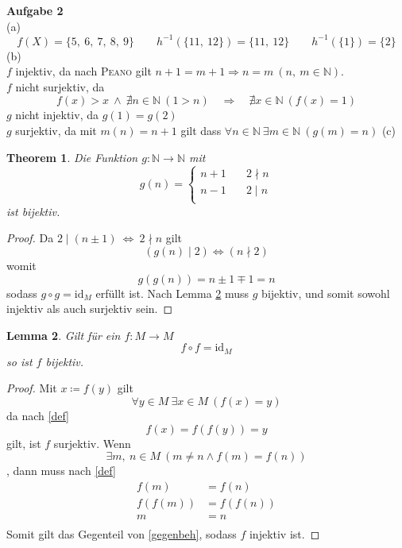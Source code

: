 \documentclass[a4paper, 12pt]{scrartcl}
\theoremstyle{plain}
\newtheorem{theorem}{Theorem}
\newtheorem{lemma}[theorem]{Lemma}
\begin{document}
\textbf{Aufgabe 2}\\
(a)\\
\[ f(X) = \{ 5,\ 6,\ 7,\ 8,\ 9 \} \qquad h^{-1}\left( \{11,\ 12\} \right) = \{11,\ 12\} \qquad h^{-1}(\{1\}) = \{2\} \]
(b)\\
$f$ injektiv, da nach \textsc{Peano} gilt $n+1 = m+1 \Rightarrow n = m\ (n,\ m \in \mathbb{N})$. \\
$f$ nicht surjektiv, da
\[ f(x) > x \ \wedge\ \nexists n \in \mathbb{N}\ (1 > n) \quad \Rightarrow \quad \nexists x \in \mathbb{N}\ (f(x) = 1) \]
$g$ nicht injektiv, da $g(1) = g(2)$ \\
$g$ surjektiv, da mit $m(n) = n+1$ gilt dass $\forall n \in \mathbb{N}\ \exists m \in \mathbb{N}\ (g(m) = n)$
\newpage
(c)
\begin{theorem}
Die Funktion $g : \mathbb{N} \rightarrow \mathbb{N}$ mit
\[ g(n) = \begin{cases} n+1 &\quad 2 \nmid n \\ n-1 &\quad 2 \mid n \\ \end{cases} \]
ist bijektiv.
\end{theorem}
\begin{proof}
Da $2 \mid (n \pm 1) \:\Leftrightarrow\: 2 \nmid n$ gilt
\[ (g(n) \mid 2) \Leftrightarrow (n \nmid 2) \]
womit
\[ g(g(n)) = n \pm 1 \mp 1 = n \]
sodass $g \circ g = \mathrm{id}_M$ erfüllt ist. Nach Lemma \ref{klemma} muss $g$ bijektiv, und somit sowohl injektiv als auch surjektiv sein.
\end{proof}
\begin{lemma}\label{klemma}
Gilt für ein $f:M \rightarrow M$
\begin{equation}\label{def}
	f \circ f = \mathrm{id}_M
\end{equation}
so ist $f$ bijektiv.
\end{lemma}
\begin{proof}
Mit $x \coloneqq f(y)$ gilt
\[ \forall y \in M\ \exists x \in M\ (f(x) = y) \]
da nach \eqref{def}
\[ f(x) = f(f(y)) = y \]
gilt, ist $f$ surjektiv.
Wenn
\begin{equation}\label{gegenbeh}
	\exists m,\ n \in M\ (m \neq n \wedge f(m) = f(n))
\end{equation}
, dann muss nach \eqref{def}
\begin{align*}
	f(m) &= f(n) \\
	f(f(m)) &= f(f(n)) \\
	m &= n \\ %
\end{align*}
Somit gilt das Gegenteil von \eqref{gegenbeh}, sodass $f$ injektiv ist.
\end{proof}
\end{document}
